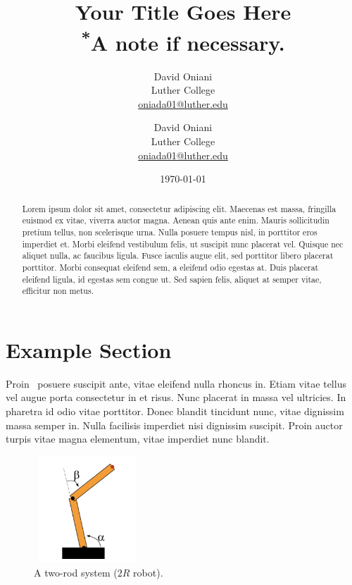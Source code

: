 \documentclass[11pt]{article}
\author{David Oniani\\
        Luther College\\
        \href{mailto:oniada01@luther.edu}{oniada01@luther.edu}
        \and
        David Oniani\\
        Luther College\\
        \href{mailto:oniada01@luther.edu}{oniada01@luther.edu}}
\title{\textbf{Your Title Goes Here}\\
      {\small\textsuperscript{*}A note if necessary.}}
\date{\today}
\begin{document}
\maketitle


\begin{abstract}

\noindent Lorem ipsum dolor sit amet, consectetur adipiscing elit. Maecenas
est massa, fringilla euismod ex vitae, viverra auctor magna. Aenean quis ante
enim. Mauris sollicitudin pretium tellus, non scelerisque urna. Nulla posuere
tempus nisl, in porttitor eros imperdiet et. Morbi eleifend vestibulum felis,
ut suscipit nunc placerat vel. Quisque nec aliquet nulla, ac faucibus ligula.
Fusce iaculis augue elit, sed porttitor libero placerat porttitor. Morbi
consequat eleifend sem, a eleifend odio egestas at. Duis placerat eleifend
ligula, id egestas sem congue ut. Sed sapien felis, aliquet at semper vitae,
efficitur non metus.
\end{abstract}


\newpage
\tableofcontents
\newpage


\section{Example Section}

Proin~\cite{munkres2000} posuere suscipit ante, vitae eleifend nulla rhoncus
in. Etiam vitae tellus vel augue porta consectetur in et risus. Nunc placerat
in massa vel ultricies. In pharetra id odio vitae porttitor. Donec blandit
tincidunt nunc, vitae dignissim massa semper in. Nulla facilisis imperdiet nisi
dignissim suscipit. Proin auctor turpis vitae magna elementum, vitae imperdiet
nunc blandit.

\begin{figure}[h]
  \centering
  \includegraphics[width=4cm, height=4cm]{image/two-rod-system}
  \caption{A two-rod system ($2R$ robot).}
\end{figure}
\end{document}
